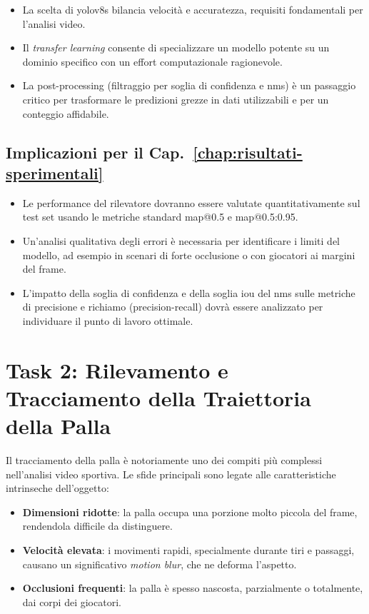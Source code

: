 \documentclass[12pt,a4paper,openright,twoside]{book}
\begin{document}
\begin{itemize}
  \item La scelta di \ac{yolo}v8s bilancia velocità e accuratezza, requisiti fondamentali per l'analisi video.
  \item Il \emph{transfer learning} consente di specializzare un modello potente su un dominio specifico con un effort computazionale ragionevole.
  \item La post-processing (filtraggio per soglia di confidenza e \ac{nms}) è un passaggio critico per trasformare le predizioni grezze 
  in dati utilizzabili e per un conteggio affidabile.
\end{itemize}

\subsection*{Implicazioni per il Cap.~\ref{chap:risultati-sperimentali}}

\begin{itemize}
  \item Le performance del rilevatore dovranno essere valutate quantitativamente sul test set usando le metriche standard \ac{map}@0.5 e 
  \ac{map}@0.5:0.95.
  \item Un'analisi qualitativa degli errori è necessaria per identificare i limiti del modello, ad esempio in scenari di forte occlusione o 
  con giocatori ai margini del frame.
  \item L'impatto della soglia di confidenza e della soglia \ac{iou} del \ac{nms} sulle metriche di precisione e richiamo (precision-recall) 
  dovrà essere analizzato per individuare il punto di lavoro ottimale.
\end{itemize}

\section{Task 2: Rilevamento e Tracciamento della Traiettoria della Palla}
\label{sec:task-2}

Il tracciamento della palla è notoriamente uno dei compiti più complessi nell'analisi video sportiva. Le sfide principali sono legate alle 
caratteristiche intrinseche dell'oggetto:

\begin{itemize}
  \item \textbf{Dimensioni ridotte}: la palla occupa una porzione molto piccola del frame, rendendola difficile da distinguere.
  \item \textbf{Velocità elevata}: i movimenti rapidi, specialmente durante tiri e passaggi, causano un significativo \emph{motion blur}, 
  che ne deforma l'aspetto.
  \item \textbf{Occlusioni frequenti}: la palla è spesso nascosta, parzialmente o totalmente, dai corpi dei giocatori.
\end{itemize}
\end{document}
